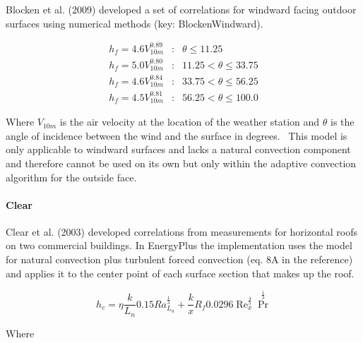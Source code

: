 Blocken et al. (2009) developed a set of correlations for windward facing outdoor surfaces using numerical methods (key: BlockenWindward).

\begin{equation}
\begin{array}{lcl}
    h_f = 4.6V^{0.89}_{10m} & : & \theta \leq 11.25 \\
    h_f = 5.0V^{0.80}_{10m} & : & 11.25 < \theta \leq 33.75 \\
    h_f = 4.6V^{0.84}_{10m} & : & 33.75 < \theta \leq 56.25 \\
    h_f = 4.5V^{0.81}_{10m} & : & 56.25 < \theta \leq 100.0
\end{array}
\end{equation}

Where \(V_{10m}\) is the air velocity at the location of the weather station and \(\theta\) is the angle of incidence between the wind and the surface in degrees.~ This model is only applicable to windward surfaces and lacks a natural convection component and therefore cannot be used on its own but only within the adaptive convection algorithm for the outside face.

\paragraph{Clear}\label{clear}

Clear et al. (2003) developed correlations from measurements for horizontal roofs on two commercial buildings. In EnergyPlus the implementation uses the model for natural convection plus turbulent forced convection (eq. 8A in the reference) and applies it to the center point of each surface section that makes up the roof.

\begin{equation}
{h_c} = \eta \frac{k}{{{L_n}}}0.15Ra_{{L_n}}^{{\frac{1}{3}}} + \frac{k}{x}{R_f}0.0296\operatorname{Re}_x^{{\frac{4}{5}}}{\Pr ^{{\frac{1}{3}}}}
\end{equation}

Where

